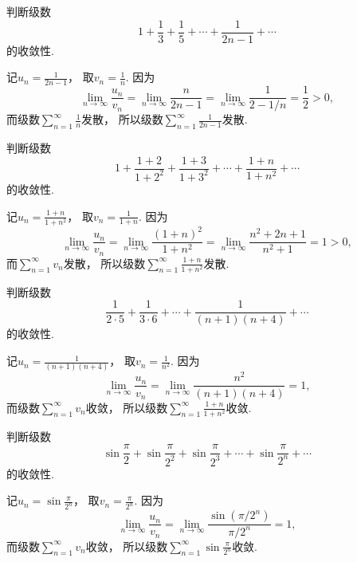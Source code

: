 \begin{example}
判断级数\[
	1 + \frac{1}{3} + \frac{1}{5} + \dotsb + \frac{1}{2n-1} + \dotsb
\]的收敛性.
\begin{solution}
记\(u_n = \frac{1}{2n-1}\)，
取\(v_n = \frac{1}{n}\).
因为\[
	\lim_{n\to\infty} \frac{u_n}{v_n}
	= \lim_{n\to\infty} \frac{n}{2n-1}
	= \lim_{n\to\infty} \frac{1}{2-1/n}
	= \frac{1}{2}
	> 0,
\]
而级数\(\sum_{n=1}^\infty \frac{1}{n}\)发散，
所以级数\(\sum_{n=1}^\infty \frac{1}{2n-1}\)发散.
\end{solution}
\end{example}

\begin{example}
判断级数\[
	1 + \frac{1+2}{1+2^2} + \frac{1+3}{1+3^2} + \dotsb + \frac{1+n}{1+n^2} + \dotsb
\]的收敛性.
\begin{solution}
记\(u_n = \frac{1+n}{1+n^2}\)，
取\(v_n = \frac{1}{1+n}\).
因为\[
	\lim_{n\to\infty} \frac{u_n}{v_n}
	= \lim_{n\to\infty} \frac{(1+n)^2}{1+n^2}
	= \lim_{n\to\infty} \frac{n^2 + 2n + 1}{n^2 + 1}
	= 1 > 0,
\]
而\(\sum_{n=1}^\infty v_n\)发散，
所以级数\(\sum_{n=1}^\infty \frac{1+n}{1+n^2}\)发散.
\end{solution}
\end{example}

\begin{example}
判断级数\[
	\frac{1}{2\cdot5} + \frac{1}{3\cdot6} + \dotsb + \frac{1}{(n+1)(n+4)} + \dotsb
\]的收敛性.
\begin{solution}
记\(u_n = \frac{1}{(n+1)(n+4)}\)，
取\(v_n = \frac{1}{n^2}\).
因为\[
	\lim_{n\to\infty} \frac{u_n}{v_n}
	= \lim_{n\to\infty} \frac{n^2}{(n+1)(n+4)}
	= 1,
\]
而级数\(\sum_{n=1}^\infty v_n\)收敛，
所以级数\(\sum_{n=1}^\infty \frac{1+n}{1+n^2}\)收敛.
\end{solution}
\end{example}

\begin{example}
\newcommand\sinfrac[1][]{\sin\frac{\pi}{2^{#1}}}
判断级数\[
	\sinfrac + \sinfrac[2] + \sinfrac[3] + \dotsb + \sinfrac[n] + \dotsb
\]的收敛性.
\begin{solution}
记\(u_n = \sin\frac{\pi}{2^n}\)，
取\(v_n = \frac{\pi}{2^n}\).
因为\[
	\lim_{n\to\infty} \frac{u_n}{v_n}
	= \lim_{n\to\infty} \frac{\sin(\pi/2^n)}{\pi/2^n}
	= 1,
\]
而级数\(\sum_{n=1}^\infty v_n\)收敛，
所以级数\(\sum_{n=1}^\infty \sin\frac{\pi}{2^n}\)收敛.
\end{solution}
\end{example}

